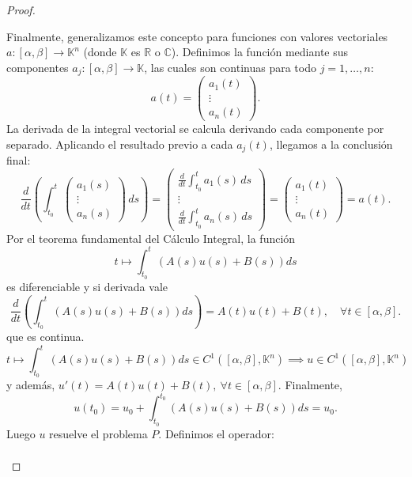 \begin{proof}
\begin{enumerate}
        Finalmente, generalizamos este concepto para funciones con valores vectoriales $a : [\alpha, \beta] \to \mathbb{K}^n$ (donde $\mathbb{K}$ es $\mathbb{R}$ o $\mathbb{C}$). Definimos la función mediante sus componentes $a_j : [\alpha, \beta] \to \mathbb{K}$, las cuales son continuas para todo $j = 1, \ldots, n$:
        \[
            a(t) = \begin{pmatrix}
            a_1(t) \\
            \vdots \\
            a_n(t)
            \end{pmatrix}.
        \]
        La derivada de la integral vectorial se calcula derivando cada componente por separado. Aplicando el resultado previo a cada $a_j(t)$, llegamos a la conclusión final:
        \[
            \frac{d}{dt} \left( \int_{t_0}^{t} \begin{pmatrix}
            a_1(s) \\
            \vdots \\
            a_n(s)
            \end{pmatrix} \, ds \right) = \begin{pmatrix}
            \frac{d}{dt} \int_{t_0}^{t} a_1(s) \, ds \\
            \vdots \\
            \frac{d}{dt} \int_{t_0}^{t} a_n(s) \, ds
            \end{pmatrix} = \begin{pmatrix}
            a_1(t) \\
            \vdots \\
            a_n(t)
            \end{pmatrix} = a(t).
        \]
        Por el teorema fundamental del Cálculo Integral, la función
        \[
            t \mapsto \int_{t_0}^{t} (A(s) u(s) + B(s)) ds
        \]
        es diferenciable y si derivada vale 
        \[
            \frac{d}{dt} \left( \int_{t_0}^{t} (A(s) u(s) + B(s)) ds \right) = A(t) u(t) + B(t), \quad \forall t \in [\alpha, \beta].
        \]
        que es continua.
        \[
            t \mapsto \int_{t_0}^{t} (A(s) u(s) + B(s)) ds \in C^1([\alpha, \beta], \mathbb{K}^n) \implies u \in C^1([\alpha, \beta], \mathbb{K}^n)
        \]
        y además, $u'(t) = A(t) u(t) + B(t), \ \forall t \in [\alpha, \beta]$. Finalmente, 
        \[
            u(t_0) = u_0 + \int_{t_0}^{t_0} (A(s) u(s) + B(s)) ds = u_0.
        \]
        Luego $u$ resuelve el problema $P$. Definimos el operador:
        \[
            \begin{matrix}

\end{matrix}\]
\end{enumerate}
\end{proof}
